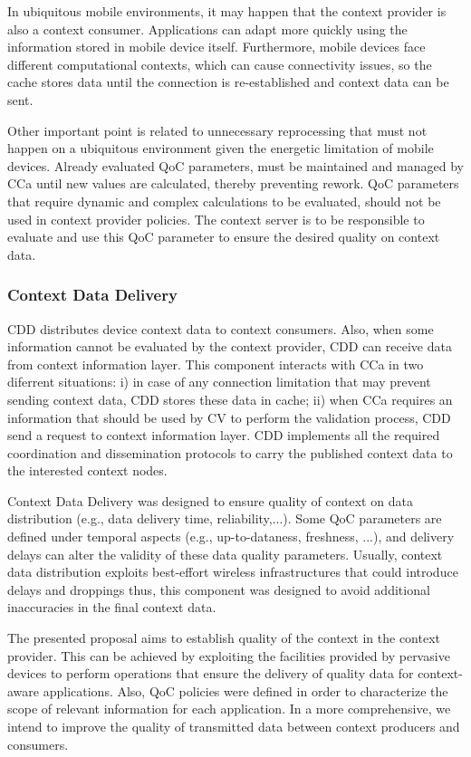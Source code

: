 \documentclass[letterpaper,conference]{IEEEtran}
\begin{document}
 In ubiquitous mobile environments, it may happen that the context provider is also a 
 context consumer. Applications can adapt more quickly using the information stored in 
 mobile device itself. Furthermore, mobile devices face different computational contexts,
 which can cause connectivity issues, so the cache stores data until the connection is 
 re-established and context data can be sent.
 
 Other important point is related to unnecessary reprocessing that must not happen on a 
 ubiquitous environment given the energetic limitation of mobile devices. Already 
 evaluated QoC parameters, must be maintained and managed by CCa until new values are 
 calculated, thereby preventing rework. QoC parameters that require dynamic and complex 
 calculations to be evaluated, should not be used in context provider policies. The 
 context server is to be responsible to evaluate and use this QoC parameter to ensure 
 the desired quality on context data.
 
 \subsubsection{Context Data Delivery}
 
 CDD distributes device context data to context consumers. Also, when some information 
 cannot be evaluated by the context provider, CDD can receive data from context 
 information layer. This component interacts with CCa in two diferrent situations: 
 i) in case of any connection limitation that may prevent sending context data, CDD 
 stores these data in cache; ii) when CCa requires an information that should be used 
 by CV to perform the validation process, CDD send a request to context information 
 layer. CDD implements all the required coordination and dissemination protocols to 
 carry the published context data to the interested context nodes.
 
 Context Data Delivery was designed to ensure quality of context on data distribution 
 (e.g., data delivery time, reliability,...). Some QoC parameters are defined under 
 temporal aspects (e.g., up-to-dataness, freshness, ...), and delivery delays can alter
 the validity of these data quality parameters. Usually, context data distribution 
 exploits best-effort wireless infrastructures that could introduce delays and 
 droppings \cite{bellavista2013survey} thus, this component was designed to avoid 
 additional inaccuracies in the final context data. 
 
 The presented proposal aims to establish quality of the context in the context provider.
 This can be achieved by exploiting the facilities provided by pervasive devices to 
 perform operations that ensure the delivery of quality data for context-aware 
 applications. Also, QoC policies were defined in order to characterize the scope of 
 relevant information for each application. In a more comprehensive, we intend to 
 improve the quality of transmitted data between context producers and consumers.
 
\end{document}
